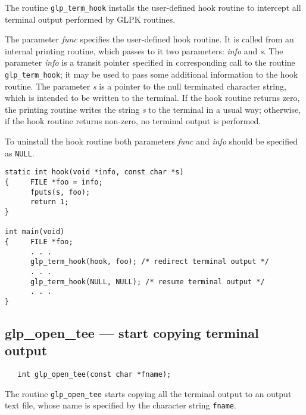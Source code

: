 \description

The routine \verb|glp_term_hook| installs the user-defined hook routine
to intercept all terminal output performed by GLPK routines.


The parameter {\it func} specifies the user-defined hook routine. It is
called from an internal printing routine, which passes to it two
parameters: {\it info} and {\it s}. The parameter {\it info} is a
transit pointer specified in corresponding call to the routine
\verb|glp_term_hook|; it may be used to pass some additional information
to the hook routine. The parameter {\it s} is a pointer to the null
terminated character string, which is intended to be written to the
terminal. If the hook routine returns zero, the printing routine writes
the string {\it s} to the terminal in a usual way; otherwise, if the
hook routine returns non-zero, no terminal output is performed.

To uninstall the hook routine both parameters {\it func} and {\it info}
should be specified as \verb|NULL|.


\begin{footnotesize}
\begin{verbatim}
static int hook(void *info, const char *s)
{     FILE *foo = info;
      fputs(s, foo);
      return 1;
}

int main(void)
{     FILE *foo;
      . . .
      glp_term_hook(hook, foo); /* redirect terminal output */
      . . .
      glp_term_hook(NULL, NULL); /* resume terminal output */
      . . .
}
\end{verbatim}
\end{footnotesize}

\newpage

\subsection{glp\_open\_tee --- start copying terminal output}

\synopsis

\begin{verbatim}
   int glp_open_tee(const char *fname);
\end{verbatim}

\description

The routine \verb|glp_open_tee| starts copying all the terminal output
to an output text file, whose name is specified by the character string
\verb|fname|.

